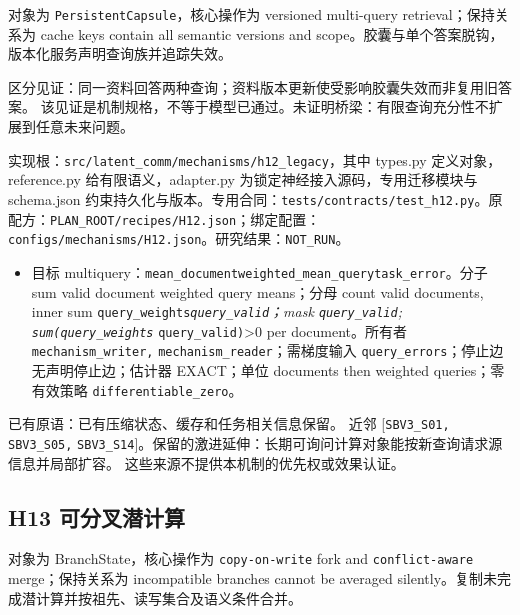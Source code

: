 \documentclass[
  10pt,
]{article}
\providecommand{\tightlist}{%
  \setlength{\itemsep}{0pt}\setlength{\parskip}{0pt}}
\begin{document}
对象为 \nolinkurl{PersistentCapsule}，核心操作为 versioned multi-query
retrieval；保持关系为 cache keys contain all semantic versions and
scope。胶囊与单个答案脱钩，版本化服务声明查询族并追踪失效。

区分见证：同一资料回答两种查询；资料版本更新使受影响胶囊失效而非复用旧答案。
该见证是机制规格，不等于模型已通过。未证明桥梁：有限查询充分性不扩展到任意未来问题。

实现根：{\small\nolinkurl{src/latent_comm/mechanisms/h12_legacy}}，其中
types.py 定义对象，reference.py 给有限语义，adapter.py
为锁定神经接入源码，专用迁移模块与 schema.json
约束持久化与版本。专用合同：{\small\nolinkurl{tests/contracts/test_h12.py}}。原配方：{\small\nolinkurl{PLAN_ROOT/recipes/H12.json}}；绑定配置：{\small\nolinkurl{configs/mechanisms/H12.json}}。研究结果：\nolinkurl{NOT_RUN}。

\begin{itemize}
\tightlist
\item
  目标
  multiquery：{\small\nolinkurl{mean_document}\hspace{0.333em}\nolinkurl{weighted_mean_query}\hspace{0.333em}\nolinkurl{task_error}}。分子
  sum valid document weighted query means；分母 count valid documents,
  inner sum \nolinkurl{query_weights}\emph{\nolinkurl{query_valid}；mask
  \nolinkurl{query_valid}; \nolinkurl{sum(query_weights} }
  \nolinkurl{query_valid)}\textgreater{}0 per document。所有者
  \nolinkurl{mechanism_writer,} \nolinkurl{mechanism_reader}；需梯度输入
  \nolinkurl{query_errors}；停止边 无声明停止边；估计器 EXACT；单位
  documents then weighted queries；零有效策略
  \nolinkurl{differentiable_zero}。
\end{itemize}

已有原语：已有压缩状态、缓存和任务相关信息保留。 近邻
{[}\nolinkurl{SBV3_S01,} \nolinkurl{SBV3_S05,}
\nolinkurl{SBV3_S14}{]}。保留的激进延伸：长期可询问计算对象能按新查询请求源信息并局部扩容。
这些来源不提供本机制的优先权或效果认证。

\subsection{H13
可分叉潜计算}\label{h13-ux53efux5206ux53c9ux6f5cux8ba1ux7b97}

对象为 BranchState，核心操作为 \nolinkurl{copy-on-write} fork and
\nolinkurl{conflict-aware} merge；保持关系为 incompatible branches
cannot be averaged
silently。复制未完成潜计算并按祖先、读写集合及语义条件合并。
\end{document}
